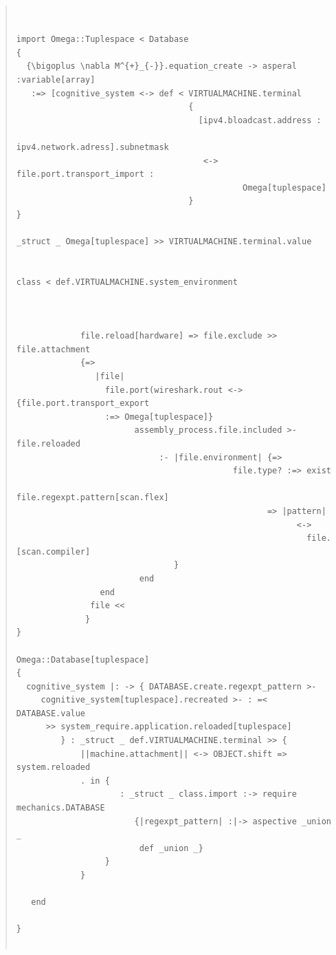 \documentclass{jsarticle}
\begin{document}
\begin{quote}
\setlength{\baselineskip}{12pt}
\begin{verbatim}


import Omega::Tuplespace < Database
{
  {\bigoplus \nabla M^{+}_{-}}.equation_create -> asperal :variable[array]
   :=> [cognitive_system <-> def < VIRTUALMACHINE.terminal
                                   {
                                     [ipv4.bloadcast.address : 
                                       ipv4.network.adress].subnetmask
                                      <-> file.port.transport_import :
                                              Omega[tuplespace]
                                   }
}

_struct _ Omega[tuplespace] >> VIRTUALMACHINE.terminal.value


class < def.VIRTUALMACHINE.system_environment



             file.reload[hardware] => file.exclude >> file.attachment
             {=>
                |file|
                  file.port(wireshark.rout <-> {file.port.transport_export 
                  :=> Omega[tuplespace]}
                        assembly_process.file.included >- file.reloaded
                             :- |file.environment| {=>
                                            file.type? :=> exist
                                              file.regexpt.pattern[scan.flex]
                                                   => |pattern|
                                                         <->
                                                           file.[scan.compiler]
                                }              
                         end
                 end
               file <<
              }
}

Omega::Database[tuplespace]
{
  cognitive_system |: -> { DATABASE.create.regexpt_pattern >-
     cognitive_system[tuplespace].recreated >- : =< DATABASE.value 
      >> system_require.application.reloaded[tuplespace]
         } : _struct _ def.VIRTUALMACHINE.terminal >> {
             ||machine.attachment|| <-> OBJECT.shift => system.reloaded                  
             . in {
                     : _struct _ class.import :-> require mechanics.DATABASE
                        {|regexpt_pattern| :|-> aspective _union _
                         def _union _} 
                  }
             }
     
   end                    
                       
}


\end{verbatim}
\end{quote}
\end{document}
